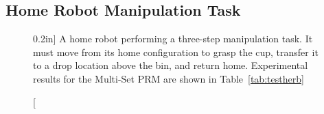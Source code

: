 \subsection{Home Robot Manipulation Task}
\label{subsec:herb-experiment}

\begin{figure}[t]
   \centering
   

   \caption[][0.2in]{
     A home robot performing a three-step manipulation task.
     It must move from its home configuration
     to grasp the cup,
     transfer it to a drop location above the bin,
     and return home.
     Experimental results for the Multi-Set PRM
     are shown in Table~\ref{tab:testherb}}
   \label{fig:testherb-problem}
\end{figure}

